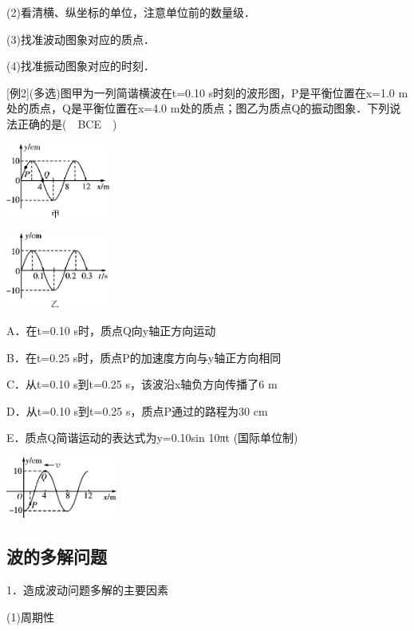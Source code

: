 (2)看清横、纵坐标的单位，注意单位前的数量级．

(3)找准波动图象对应的质点．

(4)找准振动图象对应的时刻．

{[}例2{]}(多选)图甲为一列简谐横波在t=0.10
s时刻的波形图，P是平衡位置在x=1.0 m处的质点，Q是平衡位置在x=4.0
m处的质点；图乙为质点Q的振动图象．下列说法正确的是(　BCE　)

\begin{center}\includegraphics[width=1.33958in,height=0.97153in]{media/image534.png}\end{center}

\begin{center}\includegraphics[width=1.34931in,height=0.99028in]{media/image535.png}\end{center}
A．在t=0.10 s时，质点Q向y轴正方向运动

B．在t=0.25 s时，质点P的加速度方向与y轴正方向相同

C．从t=0.10 s到t=0.25 s，该波沿x轴负方向传播了6 m

D．从t=0.10 s到t=0.25 s，质点P通过的路程为30 cm

E．质点Q简谐运动的表达式为y=0.10sin 10πt (国际单位制)

\begin{center}\includegraphics[width=1.43403in,height=0.79236in]{media/image536.png}\end{center}
\subsection{波的多解问题}

1．造成波动问题多解的主要因素

(1)周期性


